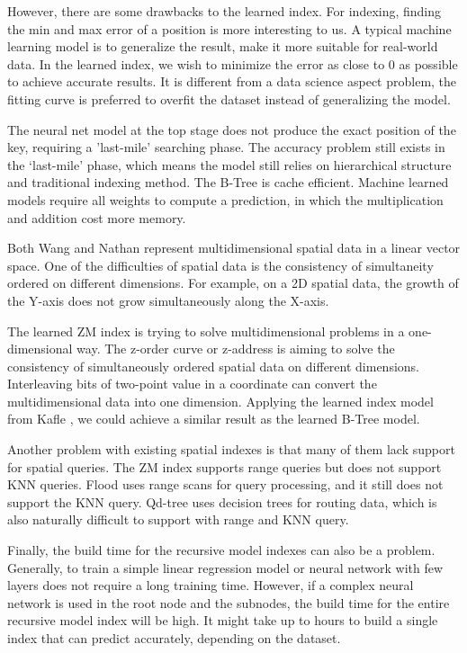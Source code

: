 However, there are some drawbacks to the learned index. For indexing, finding the min and max error of a position is more interesting to us. A typical machine learning model is to generalize the result, make it more suitable for real-world data. In the learned index, we wish to minimize the error as close to 0 as possible to achieve accurate results. It is different from a data science aspect problem, the fitting curve is preferred to overfit the dataset instead of generalizing the model. 

The neural net model at the top stage does not produce the exact position of the key, requiring a 'last-mile' searching phase. The accuracy problem still exists in the ‘last-mile’ phase, which means the model still relies on hierarchical structure and traditional indexing method. The B-Tree is cache efficient. Machine learned models require all weights to compute a prediction, in which the multiplication and addition cost more memory. 
 

Both Wang \cite{Wang:2019ks} and Nathan \cite{Nathan:2019wc} represent multidimensional spatial data in a linear vector space. One of the difficulties of spatial data is the consistency of simultaneity ordered on different dimensions. For example, on a 2D spatial data, the growth of the Y-axis does not grow simultaneously along the X-axis. 


The learned ZM index is trying to solve multidimensional problems in a one-dimensional way. The z-order curve or z-address is aiming to solve the consistency of simultaneously ordered spatial data on different dimensions. Interleaving bits of two-point value in a coordinate can convert the multidimensional data into one dimension. Applying the learned index model from Kafle \cite{Kafle:2017dy}, we could achieve a similar result as the learned B-Tree model. 

Another problem with existing spatial indexes is that many of them lack support for spatial queries. The ZM index supports range queries but does not support KNN queries. Flood uses range scans for query processing, and it still does not support the KNN query. Qd-tree uses decision trees for routing data, which is also naturally difficult to support with range and KNN query. 


Finally, the build time for the recursive model indexes can also be a problem. Generally, to train a simple linear regression model or neural network with few layers does not require a long training time. However, if a complex neural network is used in the root node and the subnodes, the build time for the entire recursive model index will be high. It might take up to hours to build a single index that can predict accurately, depending on the dataset. 

